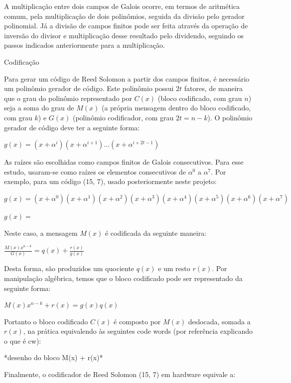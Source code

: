 	A multiplicação entre dois campos de Galois ocorre, em termos de aritmética comum, pela multiplicação de dois polinômios, seguida da divisão pelo gerador polinomial. Já a divisão  de campos finitos pode ser feita através da operação de inversão do divisor e multiplicação desse resultado pelo dividendo, seguindo os passos indicados anteriormente para a multiplicação. 
	 
	 Codificação 
	 
	Para gerar um código de Reed Solomon a partir dos campos finitos, é necessário um polinômio gerador de código. Este polinômio possui $2t$ fatores, de maneira que o grau do polinômio representado por $C(x)$ (bloco codificado, com grau $n$) seja a soma do grau de $M(x)$ (a própria mensagem dentro do bloco codificado, com grau $k$) e $G(x)$ (polinômio codificador, com grau $2t = n - k$). O polinômio gerador de código deve ter a seguinte forma:
	 
	 $g(x) = (x + \alpha^{i})(x + \alpha^{i+1})...(x + \alpha^{i + 2t - 1})  $
	
	
	As raízes são escolhidas como campos finitos de Galois consecutivos. Para esse estudo, usaram-se como raízes os elementos consecutivos de $\alpha^{0}$ a $\alpha^{7}$. Por exemplo, para um código (15, 7), usado posteriormente neste projeto:
	 
	$g(x) = (x + \alpha^{0})(x + \alpha^{1})(x + \alpha^{2})(x + \alpha^{3})(x + \alpha^{4})(x + \alpha^{5})(x + \alpha^{6})(x + \alpha^{7})$
	 
	$g(x) = $
	
	
	Neste caso, a mensagem $M(x)$ é codificada da seguinte maneira:
	
	
	$\frac{M(x)x^{n-k}}{G(x)} = q(x) + \frac{r(x)}{g(x)}$
	 
	 
	Desta forma, são produzidos um quociente $q(x)$ e um resto $r(x)$. Por manipulação algébrica, temos que o bloco codificado pode ser representado da seguinte forma:
	 
	$M(x)x^{n-k} + r(x) = g(x)q(x)$
	
	
	Portanto o bloco codificado $C(x)$ é composto por $M(x)$ deslocada, somada a $r(x)$, na prática equivalendo às seguintes code words (por referência explicando o que é cw):
	 
	 *desenho do bloco M(x) + r(x)*
	
	
	Finalmente, o codificador de Reed Solomon (15, 7) em hardware equivale a:
	 
	 

	
	
	\cite{nasa-rs1}

